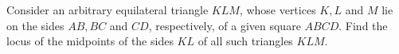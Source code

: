 Consider an arbitrary equilateral triangle $KLM$, whose vertices $K, L$ and $M$ lie on the sides $AB, BC$ and $CD$, respectively, of a given square $ABCD$. Find the locus of the midpoints of the sides $KL$ of all such triangles $KLM$.